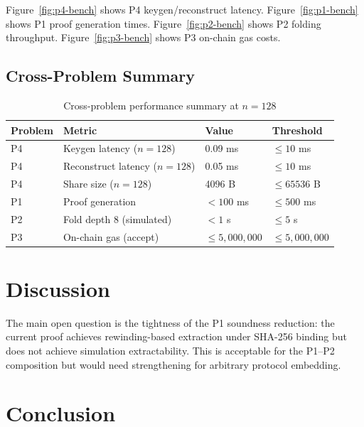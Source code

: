 \documentclass{llncs}
\begin{document}
Figure~\ref{fig:p4-bench} shows P4 keygen/reconstruct latency. Figure~\ref{fig:p1-bench}
shows P1 proof generation times. Figure~\ref{fig:p2-bench} shows P2 folding throughput.
Figure~\ref{fig:p3-bench} shows P3 on-chain gas costs.






\subsection{Cross-Problem Summary}

\begin{table}[h]
\caption{Cross-problem performance summary at $n = 128$}
\label{tab:summary}
\centering
\begin{tabular}{llll}
\hline
Problem & Metric & Value & Threshold \\
\hline
P4 & Keygen latency ($n=128$) & 0.09 ms & $\leq 10$ ms \\
P4 & Reconstruct latency ($n=128$) & 0.05 ms & $\leq 10$ ms \\
P4 & Share size ($n=128$) & 4096 B & $\leq 65536$ B \\
P1 & Proof generation & $< 100$ ms & $\leq 500$ ms \\
P2 & Fold depth 8 (simulated) & $< 1$ s & $\leq 5$ s \\
P3 & On-chain gas (accept) & $\leq 5{,}000{,}000$ & $\leq 5{,}000{,}000$ \\
\hline
\end{tabular}
\end{table}

\section{Discussion}

The main open question is the tightness of the P1 soundness reduction: the current proof
achieves rewinding-based extraction under SHA-256 binding but does not achieve simulation
extractability. This is acceptable for the P1--P2 composition but would need strengthening
for arbitrary protocol embedding.

\section{Conclusion}
\end{document}
